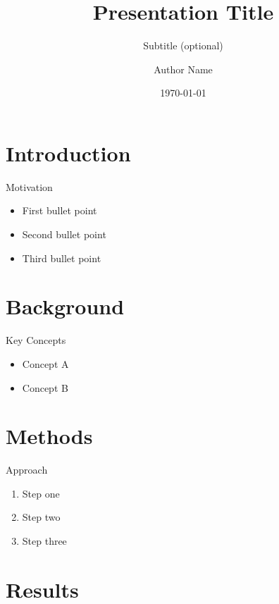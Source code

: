 \documentclass[aspectratio=169]{beamer}
\title{Presentation Title}
\subtitle{Subtitle (optional)}
\author{Author Name}
\institute{Institute / Affiliation}
\date{\today}
\begin{document}
\begin{frame}
  \titlepage
\end{frame}

\section{Introduction}

\begin{frame}{Motivation}
  \begin{itemize}
    \item First bullet point
    \item Second bullet point
    \item Third bullet point
  \end{itemize}
\end{frame}

\section{Background}

\begin{frame}{Key Concepts}
  \begin{itemize}
    \item Concept A
    \item Concept B
  \end{itemize}
\end{frame}

\section{Methods}

\begin{frame}{Approach}
  \begin{enumerate}
    \item Step one
    \item Step two
    \item Step three
  \end{enumerate}
\end{frame}

\section{Results}
\end{document}
